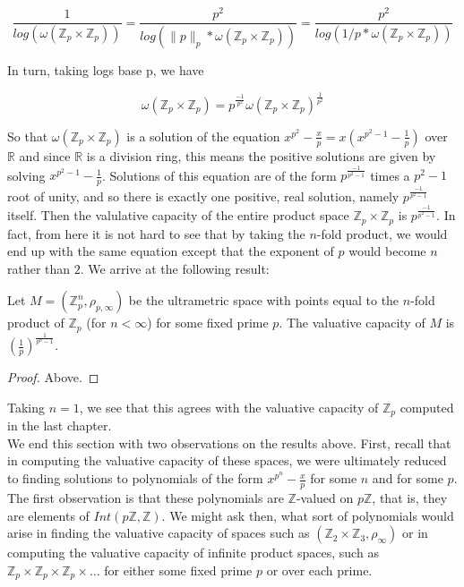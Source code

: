 \[\frac{1}{log(\omega(\mathbb{Z}_p \times \mathbb{Z}_p))} = \frac{p^2}{log(\|p\|_p * \omega(\mathbb{Z}_p \times \mathbb{Z}_p))} =  \frac{p^2}{log(1/p * \omega(\mathbb{Z}_p \times \mathbb{Z}_p))}    \]

In turn, taking logs base p, we have 


\[ \omega(\mathbb{Z}_p \times \mathbb{Z}_p) = p^{\frac{-1}{p^2}} \omega(\mathbb{Z}_p \times \mathbb{Z}_p)^{\frac{1}{p^2}}  \]

So that $\omega(\mathbb{Z}_p \times \mathbb{Z}_p)$ is a solution of the equation $x^{p^2} - \frac{x}{p} = x(x^{p^2-1} - \frac{1}{p})$ over $\mathbb{R}$ and since $\mathbb{R}$ is a division ring, this means the positive solutions are given by solving $x^{p^2-1}-\frac{1}{p}$. Solutions of this equation are of the form $p^{\frac{-1}{p^2-1}}$ times a $p^2-1$ root of unity, and so there is exactly one positive, real solution, namely $p^{\frac{-1}{p^2-1}}$ itself. Then the valulative capacity of the entire product space $\mathbb{Z}_p \times \mathbb{Z}_p$ is $p^{\frac{-1}{p^2-1}}$. In fact, from here it is not hard to see that by taking the $n$-fold product, we would end up with the same equation except that the exponent of $p$ would become $n$ rather than $2$. We arrive at the following result:

\begin{proposition*}
Let $M=(\mathbb{Z}_p^n, \rho_{p, \infty})$ be the ultrametric space with points equal to the $n$-fold product of $\mathbb{Z}_p$ (for $n < \infty$) for some fixed prime $p$. The valuative capacity of $M$ is  $(\frac{1}{p})^{\frac{1}{p^n-1}}$.
\end{proposition*}

\begin{proof}
Above.
\end{proof}

Taking $n=1$, we see that this agrees with the valuative capacity of $\mathbb{Z}_p$ computed in the last chapter. \\

We end this section with two observations on the results above.  First, recall that in computing the valuative capacity of these spaces, we were ultimately reduced to finding solutions to polynomials of the form $x^{p^n} - \frac{x}{p}$ for some $n$ and for some $p$. The first observation is that these polynomials are $\mathbb{Z}$-valued on $p\mathbb{Z}$, that is, they are elements of $Int(p\mathbb{Z},\mathbb{Z})$. We might ask then, what sort of polynomials would arise in finding the valuative capacity of spaces such as $(\mathbb{Z}_2 \times \mathbb{Z}_3, \rho_\infty)$ or in computing the valuative capacity of infinite product spaces, such as $\mathbb{Z}_p \times \mathbb{Z}_p \times \mathbb{Z}_p \times \ldots$ for either some fixed prime $p$ or over each prime. \\

